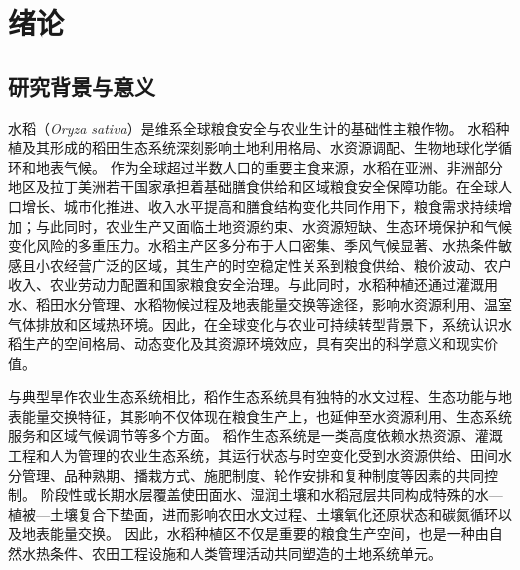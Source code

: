 \chapter{绪论}

\section{研究背景与意义}
\label{sec:background}

水稻（\textit{Oryza sativa}）是维系全球粮食安全与农业生计的基础性主粮作物。
水稻种植及其形成的稻田生态系统深刻影响土地利用格局、水资源调配、生物地球化学循环和地表气候。
作为全球超过半数人口的重要主食来源\cite{Fukagawa2019RiceNutrition,GRiSP2013}，水稻在亚洲、非洲部分地区及拉丁美洲若干国家承担着基础膳食供给和区域粮食安全保障功能\cite{Yuan2021RiceBowl}。在全球人口增长、城市化推进、收入水平提高和膳食结构变化共同作用下，粮食需求持续增加\cite{Godfray2010,Tilman2011PNAS}；与此同时，农业生产又面临土地资源约束、水资源短缺、生态环境保护和气候变化风险的多重压力\cite{Foley2011Nature,Mueller2012Nature,Lesk2016Nature}。水稻主产区多分布于人口密集、季风气候显著、水热条件敏感且小农经营广泛的区域，其生产的时空稳定性关系到粮食供给、粮价波动、农户收入、农业劳动力配置和国家粮食安全治理。与此同时，水稻种植还通过灌溉用水、稻田水分管理、水稻物候过程及地表能量交换等途径，影响水资源利用、温室气体排放和区域热环境。因此，在全球变化与农业可持续转型背景下，系统认识水稻生产的空间格局、动态变化及其资源环境效应，具有突出的科学意义和现实价值。

与典型旱作农业生态系统相比，稻作生态系统具有独特的水文过程、生态功能与地表能量交换特征\cite{KogelKnabner2010Paddy,Xue2021RemoteSensing}，其影响不仅体现在粮食生产上，也延伸至水资源利用\cite{McDermid2023Irrigation}、生态系统服务\cite{Natuhara2013PaddyServices}和区域气候调节\cite{Chen2024Croplands}等多个方面。
稻作生态系统是一类高度依赖水热资源、灌溉工程和人为管理的农业生态系统\cite{McDermid2023Irrigation}，其运行状态与时空变化受到水资源供给、田间水分管理、品种熟期、播栽方式、施肥制度\cite{Qian2023RiceGHG,Yuan2021RiceBowl}、轮作安排和复种制度\cite{Laborte2017SciData}等因素的共同控制。
阶段性或长期水层覆盖使田面水、湿润土壤和水稻冠层共同构成特殊的水—植被—土壤复合下垫面，进而影响农田水文过程、土壤氧化还原状态和碳氮循环\cite{KogelKnabner2010Paddy,McDermid2023Irrigation}以及地表能量交换\cite{Xue2021RemoteSensing,Chen2024Croplands}。
因此，水稻种植区不仅是重要的粮食生产空间，也是一种由自然水热条件、农田工程设施和人类管理活动共同塑造的土地系统单元。

